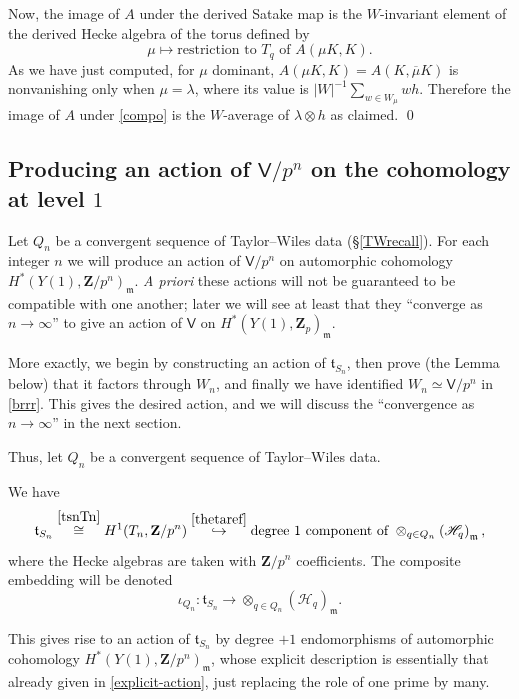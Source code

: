 \documentclass[10pt]{amsart}
\newcommand{\Z}{\mathbf{Z}}
\newcommand{\Vinf}{\mathsf{V}}
\newcommand{\mubar}{\overline{\mu}}
\theoremstyle{remark}
\begin{document}
Now, the image of $A$ under the derived Satake map
is the $W$-invariant element of the derived Hecke algebra of the torus
defined by
  $$\mu \mapsto \mbox{restriction to $T_q$ of }A(\mu K,   K).$$
As we have just computed,   for $\mu$ dominant, $A(\mu K, K) = A(K, \mubar K)$   is nonvanishing only when $\mu=\lambda$, where its value is $|W|^{-1} \sum_{w \in W_{\mu}} wh$. 
Therefore the image of $A$ under \eqref{compo} is the $W$-average of $\lambda \otimes h$ as claimed. 
\qed 


\subsection{Producing an action of $\Vinf/p^n$ on the cohomology at level $1$} \label{tSnaction} 
Let $Q_n$ be a convergent sequence of Taylor--Wiles data (\S \ref{TWrecall}). For each integer $n$ we 
will produce an action of $\Vinf/p^n$
on   automorphic cohomology $H^*(Y(1), \Z/p^n)_{\mathfrak{m}}$. 
 {\em A priori} these actions will not be guaranteed to be compatible with one another; later
 we will see at least that they ``converge as $n \rightarrow \infty$'' to give an action of $\Vinf$ on $H^*(Y(1), \Z_p)_{\mathfrak{m}}$. 

More exactly, we
begin by constructing an action of $\mathfrak{t}_{S_n}$, then prove (the Lemma below)
that it factors through $W_n$, and finally we have identified $W_n \simeq \Vinf/p^n$ in \eqref{brrr}. 
This gives the desired action, and we will discuss the ``convergence as $n \rightarrow \infty$'' in the next section.

Thus, let $Q_n$ be a convergent sequence of Taylor--Wiles data.  

 
We have   \begin{equation} \label{embed} \mathfrak{t}_{S_n} \stackrel{\eqref{tsnTn}}{\cong} H^1(T_n, \Z/p^n) \stackrel{\eqref{thetaref}}{\hookrightarrow} \mbox{degree $1$ component of }\otimes_{q \in Q_n}  \left(  \mathscr{H}_q\right)_{\mathfrak{m}} ,\end{equation}
where   the Hecke algebras are taken with $\Z/p^n$ coefficients. The composite embedding will be denoted
\begin{equation} \label{iotaQndef}  \iota_{Q_n}: \mathfrak{t}_{S_n} \rightarrow  \otimes_{q \in Q_n} \left(  \mathscr{H}_q\right)_{\mathfrak{m}}.\end{equation}

This gives rise to an  action of $ \mathfrak{t}_{S_n}$
by degree $+1$ endomorphisms of  automorphic cohomology
$H^*(Y(1), \Z/p^n)_{\mathfrak{m}}$, whose explicit description is essentially that already given in 
\eqref{explicit-action}, just replacing the role of one prime by many.  
\end{document}
